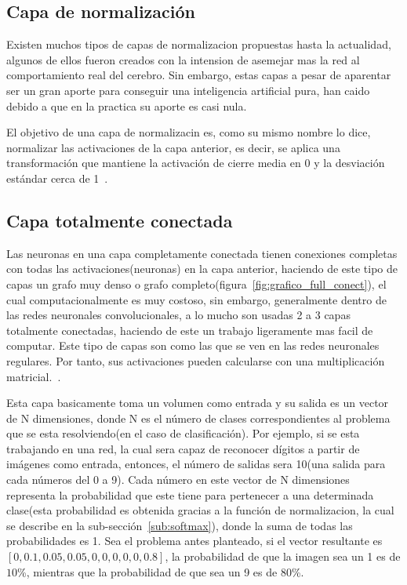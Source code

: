 \subsection{Capa de normalización}
Existen muchos tipos de capas de normalizacion propuestas hasta la actualidad, algunos de ellos fueron creados con la intension de asemejar mas la red al comportamiento real del cerebro. Sin embargo, estas capas a pesar de aparentar ser un gran aporte para conseguir una inteligencia artificial pura, han caido debido a que en la practica su aporte es casi nula. 

El objetivo de una capa de normalizacin es, como su mismo nombre lo dice, normalizar las activaciones de la capa anterior, es decir, se aplica una transformación que mantiene la activación de cierre media en 0 y la desviación estándar cerca de 1~\cite{22RedesNeuronalesConvolu}.

\subsection{Capa totalmente conectada}
Las neuronas en una capa completamente conectada tienen conexiones completas con todas las activaciones(neuronas) en la capa anterior, haciendo de este tipo de capas un grafo muy denso o grafo completo(figura~\ref{fig:grafico_full_conect}), el cual computacionalmente es muy costoso, sin embargo, generalmente dentro de las redes neuronales convolucionales, a lo mucho son usadas 2 a 3 capas totalmente conectadas, haciendo de este un trabajo ligeramente mas facil de computar. Este tipo de capas son como las que se ven en las redes neuronales regulares. Por tanto, sus activaciones pueden calcularse con una multiplicación matricial.~\cite{22RedesNeuronalesConvolu}.

Esta capa basicamente toma un volumen como entrada y su salida es un vector de N dimensiones, donde N es el número de clases correspondientes al problema que se esta resolviendo(en el caso de clasificación). Por ejemplo, si se esta trabajando en una red, la cual sera capaz de reconocer dígitos a partir de imágenes como entrada, entonces, el número de salidas sera 10(una salida para cada números del 0 a 9). Cada número en este vector de N dimensiones representa la probabilidad que este tiene para pertenecer a una determinada clase(esta probabilidad es obtenida gracias a la función de normalizacion, la cual se describe en la sub-sección~\ref{sub:softmax}), donde la suma de todas las probabilidades es 1. Sea el problema antes planteado, si el vector resultante es $[0, 0.1, 0.05 , 0.05, 0, 0, 0, 0, 0, 0.8]$, la probabilidad de que la imagen sea un 1 es de $10$\%, mientras que la probabilidad de que sea un 9 es de $80$\%.


